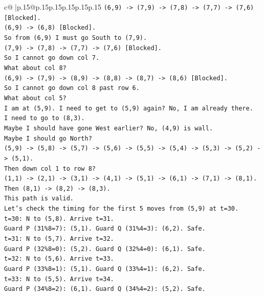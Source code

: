 \documentclass{article}
\begin{document}
{\begin{supertabular}{c@{$\;$}|p{.15\linewidth}@{}p{.15\linewidth}p{.15\linewidth}p{.15\linewidth}p{.15\linewidth}p{.15\linewidth}}
{{{\texttt{(6,9) {-}> (7,9) {-}> (7,8) {-}> (7,7) {-}> (7,6) {[}Blocked{]}.} \\
\texttt{(6,9) {-}> (6,8) {[}Blocked{]}.} \\
\texttt{So from (6,9) I must go South to (7,9).} \\
\texttt{(7,9) {-}> (7,8) {-}> (7,7) {-}> (7,6) {[}Blocked{]}.} \\
\texttt{So I cannot go down col 7.} \\
\texttt{What about col 8?} \\
\texttt{(6,9) {-}> (7,9) {-}> (8,9) {-}> (8,8) {-}> (8,7) {-}> (8,6) {[}Blocked{]}.} \\
\texttt{So I cannot go down col 8 past row 6.} \\
\texttt{What about col 5?} \\
\texttt{I am at (5,9). I need to get to (5,9) again? No, I am already there.} \\
\texttt{I need to go to (8,3).} \\
\texttt{Maybe I should have gone West earlier? No, (4,9) is wall.} \\
\texttt{Maybe I should go North?} \\
\texttt{(5,9) {-}> (5,8) {-}> (5,7) {-}> (5,6) {-}> (5,5) {-}> (5,4) {-}> (5,3) {-}> (5,2) {-}> (5,1).} \\
\texttt{Then down col 1 to row 8?} \\
\texttt{(1,1) {-}> (2,1) {-}> (3,1) {-}> (4,1) {-}> (5,1) {-}> (6,1) {-}> (7,1) {-}> (8,1).} \\
\texttt{Then (8,1) {-}> (8,2) {-}> (8,3).} \\
\texttt{This path is valid.} \\
\texttt{Let's check the timing for the first 5 moves from (5,9) at t=30.} \\
\texttt{t=30: N to (5,8). Arrive t=31.} \\
\texttt{Guard P (31\%8=7): (5,1). Guard Q (31\%4=3): (6,2). Safe.} \\
\texttt{t=31: N to (5,7). Arrive t=32.} \\
\texttt{Guard P (32\%8=0): (5,2). Guard Q (32\%4=0): (6,1). Safe.} \\
\texttt{t=32: N to (5,6). Arrive t=33.} \\
\texttt{Guard P (33\%8=1): (5,1). Guard Q (33\%4=1): (6,2). Safe.} \\
\texttt{t=33: N to (5,5). Arrive t=34.} \\
\texttt{Guard P (34\%8=2): (6,1). Guard Q (34\%4=2): (5,2). Safe.} \\
}}}
\end{supertabular}}
\end{document}
